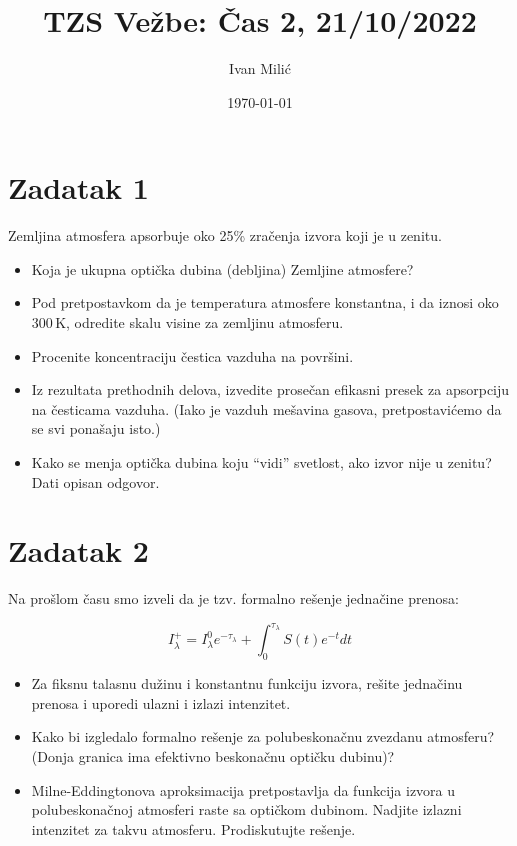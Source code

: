 \documentclass[12pt]{article}
\title{TZS Ve\v{z}be: \v{C}as 2, 21/10/2022}
\author{Ivan Mili\'{c}}
\date{\today}
\begin{document}
\maketitle

\section{Zadatak 1}

Zemljina atmosfera apsorbuje oko 25\% zra\v{c}enja izvora koji je u zenitu.
\begin{itemize}
    \item Koja je ukupna opti\v{c}ka dubina (debljina) Zemljine atmosfere?
    \item Pod pretpostavkom da je temperatura atmosfere konstantna, i da iznosi oko 300\,K, odredite skalu visine za zemljinu atmosferu.
    \item Procenite koncentraciju \v{c}estica vazduha na povr\v{s}ini. 
    \item Iz rezultata prethodnih delova, izvedite prose\v{c}an efikasni presek za apsorpciju na \v{c}esticama vazduha. (Iako je vazduh me\v{s}avina gasova, pretpostavi\'{c}emo da se svi pona\v{s}aju isto.)
    \item Kako se menja opti\v{c}ka dubina koju ``vidi'' svetlost, ako izvor nije u zenitu? Dati opisan odgovor.
\end{itemize}

\section{Zadatak 2}

Na pro\v{s}lom \v{c}asu smo izveli da je tzv. formalno re\v{s}enje jedna\v{c}ine prenosa:

\begin{equation}
I_\lambda^+ = I_\lambda^0 e^{-\tau_\lambda}+ \int_0^{\tau_\lambda} S(t) e^{-t} dt
\end{equation}

\begin{itemize}
    \item Za fiksnu talasnu du\v{z}inu i konstantnu funkciju izvora, re\v{s}ite jedna\v{c}inu prenosa i uporedi ulazni i izlazi intenzitet.
\item Kako bi izgledalo formalno re\v{s}enje za polubeskona\v{c}nu zvezdanu atmosferu? (Donja granica ima efektivno beskona\v{c}nu opti\v{c}ku dubinu)?
\item Milne-Eddingtonova aproksimacija pretpostavlja da funkcija izvora u polubeskona\v{c}noj atmosferi raste sa opti\v{c}kom dubinom. Nadjite izlazni intenzitet za takvu atmosferu. Prodiskutujte re\v{s}enje.

\end{itemize}
\end{document}
